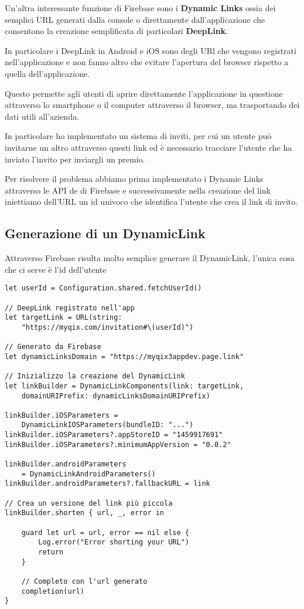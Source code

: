 
Un'altra interessante funzione di Firebase sono i \textbf{Dynamic Links}
ossia dei semplici URL generati dalla console o direttamente dall'applicazione
che consentono la creazione semplificata di particolari \textbf{DeepLink}.

In particolare i DeepLink in Android e iOS sono degli URl che vengono registrati nell'applicazione
e non fanno altro che evitare l'apertura del browser rispetto a quella dell'applicazione.

Questo permette agli utenti di aprire direttamente l'applicazione in questione
attraverso lo smartphone o il computer attraverso il browser, ma trasportando dei dati utili all'azienda.



In particolare ho implementato un sistema di inviti, per cui 
un utente può invitarne un altro attraverso questi link ed è necessario tracciare
l'utente che ha inviato l'invito per inviargli un premio.

Per risolvere il problema abbiamo prima implementato i Dynamic Links attraverso le API de
di Firebase e successivamente nella creazione del link iniettiamo dell'URL un id univoco che identifica l'utente
che crea il link di invito.

\subsection*{Generazione di un DynamicLink}

Attraverso Firebase risulta molto semplice generare il DynamicLink,
l'unica cosa che ci serve è l'id dell'utente

\begin{verbatim}
let userId = Configuration.shared.fetchUserId() 

// DeepLink registrato nell'app
let targetLink = URL(string:
    "https://myqix.com/invitation#\(userId)")

// Generato da Firebase
let dynamicLinksDomain = "https://myqix3appdev.page.link"

// Inizializzo la creazione del DynamicLink
let linkBuilder = DynamicLinkComponents(link: targetLink,
    domainURIPrefix: dynamicLinksDomainURIPrefix)

linkBuilder.iOSParameters = 
    DynamicLinkIOSParameters(bundleID: "...")
linkBuilder.iOSParameters?.appStoreID = "1459917691"
linkBuilder.iOSParameters?.minimumAppVersion = "0.0.2"

linkBuilder.androidParameters
    = DynamicLinkAndroidParameters()
linkBuilder.androidParameters?.fallbackURL = link

// Crea un versione del link più piccola
linkBuilder.shorten { url, _, error in
    
    guard let url = url, error == nil else {
        Log.error("Error shorting your URL")
        return
    }
    
    // Completo con l'url generato
    completion(url)
}

\end{verbatim}

